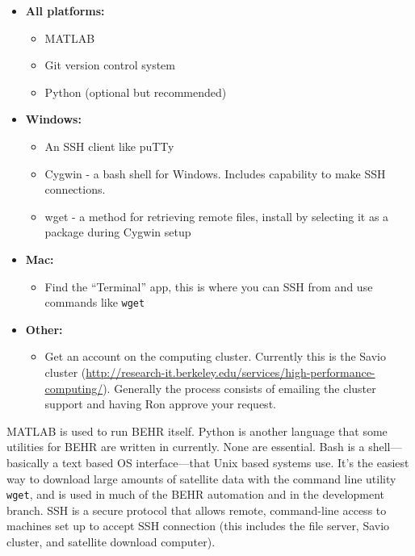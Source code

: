 \documentclass[12pt]{article}
\begin{document}
	\begin{itemize}
		\item \textbf{All platforms:}
		\begin{itemize}
			\item MATLAB
			\item Git version control system
			\item Python (optional but recommended)
		\end{itemize}
		
		\item \textbf{Windows:}
		\begin{itemize}
			\item An SSH client like puTTy
			\item Cygwin - a bash shell for Windows. Includes capability to make SSH connections.
			\item wget - a method for retrieving remote files, install by selecting it as a package during Cygwin setup
		\end{itemize}
		
		\item \textbf{Mac:}
		\begin{itemize}
			\item Find the ``Terminal'' app, this is where you can SSH from and use commands like \texttt{wget}
		\end{itemize}
		
		\item \textbf{Other:}
		\begin{itemize}
			\item Get an account on the computing cluster. Currently this is the Savio cluster (\url{http://research-it.berkeley.edu/services/high-performance-computing/}). Generally the process consists of emailing the cluster support and having Ron approve your request.
		\end{itemize}
	\end{itemize}
	
	MATLAB is used to run BEHR itself. Python is another language that some utilities for BEHR are written in currently. None are essential. Bash is a shell---basically a text based OS interface---that Unix based systems use. It's the easiest way to download large amounts of satellite data with the command line utility \texttt{wget}, and is used in much of the BEHR automation and in the development branch. SSH is a secure protocol that allows remote, command-line access to machines set up to accept SSH connection (this includes the file server, Savio cluster, and satellite download computer).
	
\end{document}
